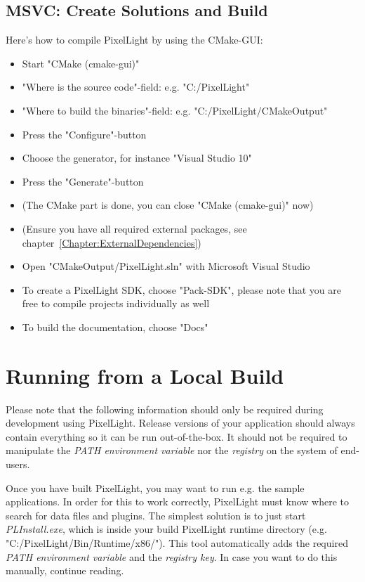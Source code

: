 \subsection{\ac{MSVC}: Create Solutions and Build}
Here's how to compile PixelLight by using the CMake-\ac{GUI}:
\begin{itemize}
\item{Start "CMake (cmake-gui)"}
\item{"Where is the source code"-field: e.g. "C:/PixelLight"}
\item{"Where to build the binaries"-field: e.g. "C:/PixelLight/CMakeOutput"}
\item{Press the "Configure"-button}
\item{Choose the generator, for instance "Visual Studio 10"}
\item{Press the "Generate"-button}
\item{(The CMake part is done, you can close "CMake (cmake-gui)" now)}
\item{(Ensure you have all required external packages, see chapter~\ref{Chapter:ExternalDependencies})}
\item{Open "CMakeOutput/PixelLight.sln" with Microsoft Visual Studio}
\item{To create a PixelLight \ac{SDK}, choose "Pack-SDK", please note that you are free to compile projects individually as well}
\item{To build the documentation, choose "Docs"}
\end{itemize}




\section{Running from a Local Build}
Please note that the following information should only be required during development using PixelLight. Release versions of your application should always contain everything so it can be run out-of-the-box. It should not be required to manipulate the \emph{PATH environment variable} nor the \emph{registry} on the system of end-users.

Once you have built PixelLight, you may want to run e.g. the sample applications. In order for this to work correctly, PixelLight must know where to search for data files and plugins. The simplest solution is to just start \emph{PLInstall.exe}, which is inside your build PixelLight runtime directory (e.g. "C:/PixelLight/Bin/Runtime/x86/"). This tool automatically adds the required \emph{PATH environment variable} and the \emph{registry key}. In case you want to do this manually, continue reading.


